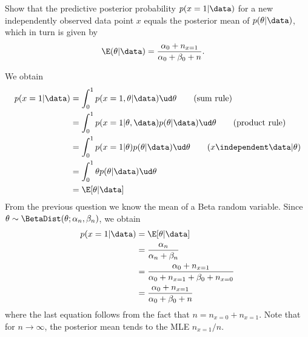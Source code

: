 \begin{exenumerate}
\item  \label{q:bernoulli-posterior-predictive} Show that the predictive posterior probability $p( x=1 | \data )$ for a
  new independently observed data point $x$ equals the posterior mean
  of $p(\theta | \data)$, which in turn is given by
  \begin{align}
    \E( \theta | \data) & = \frac{\alpha_0 + n_{x=1}}{\alpha_0+\beta_0+n}.
    \label{eq:bernoulli-posterior-mean}
  \end{align}
  \begin{solution}
    We obtain
    \begin{align}
      p(x=1 | \data) & = \int_0^1 p(x=1, \theta | \data) \ud \theta \quad \quad \text{(sum rule)}\\
      & = \int_0^1 p(x=1 | \theta, \data) p(\theta | \data) \ud \theta \quad \quad \text{(product rule)} \\
      & = \int_0^1 p(x=1 | \theta) p(\theta | \data) \ud \theta \quad \quad (x \independent \data | \theta) \\
      & = \int_0^1 \theta p(\theta | \data) \ud \theta\\
      & = \E[ \theta | \data]
    \end{align}
    From the previous question we know the mean of a Beta random variable. Since $\theta \sim \BetaDist(\theta ; \alpha_n, \beta_n)$, we obtain
    \begin{align}
      p(x=1 | \data) & =  \E[ \theta | \data]\\
      & = \frac{\alpha_n}{\alpha_n+\beta_n}\\
      & = \frac{\alpha_0 +  n_{x=1}} {\alpha_0+ n_{x=1} + \beta_0 +  n_{x=0}}\\
      & = \frac{\alpha_0 +  n_{x=1}}{\alpha_0+ \beta_0 + n}
    \end{align}
    where the last equation follows from the fact that $n= n_{x=0}+n_{x=1}$. Note that for $n \to \infty$, the posterior mean tends to the MLE
    $n_{x=1}/n$.

  \end{solution}

  
 \end{exenumerate}


\label{ex:Bayesian-Inference-DGM}

